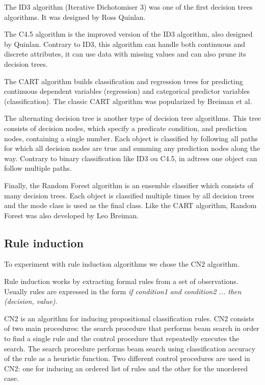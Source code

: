 \documentclass[a4paper]{llncs}
\begin{document}
The ID3 algorithm (Iterative Dichotomiser 3) was one of the first decision trees algorithms.
It was designed by Ross Quinlan.

The C4.5 algorithm is the improved version of the ID3 algorithm, also designed by Quinlan.
Contrary to ID3, this algorithm can handle both continuous and discrete attributes,
it can use data with missing values and can also prune its decision trees.

The CART algorithm builds classification and regression trees for predicting continuous dependent variables (regression)
and categorical predictor variables (classification). The classic CART algorithm was popularized by Breiman et al. \cite{cart}

The alternating decision tree is another type of decision tree algorithms. This tree
consists of decision nodes, which specify a predicate condition, and prediction nodes, containing a single number.
Each object is classified by following all paths for which all decision nodes are true and summing any
prediction nodes along the way. Contrary to binary classification like ID3 ou C4.5, in adtrees one
object can follow multiple paths. 

Finally, the Random Forest algorithm is an ensemble classifier which consists of many decision trees.
Each object is classified multiple times by all decision trees and the mode class is used as the final class.
Like the CART algorithm, Random Forest was also developed by Leo Breiman.

\subsection{Rule induction}

To experiment with rule induction algorithms we chose the CN2 \cite{cn2} algorithm.

Rule induction works by extracting formal rules from a set of observations.
Usually rules are expressed in the form \textit{if condition1 and condition2 ... then (decision, value)}.

CN2 is an algorithm for inducing 
propositional classification rules. CN2 consists of two main procedures: the 
search procedure that performs beam search in order to find a single rule and 
the control procedure that repeatedly executes the search. 
The search procedure performs beam search using classification accuracy 
of the rule as a heuristic function.
Two different control procedures are used in CN2: one for inducing an ordered 
list of rules and the other for the unordered case.
\end{document}
